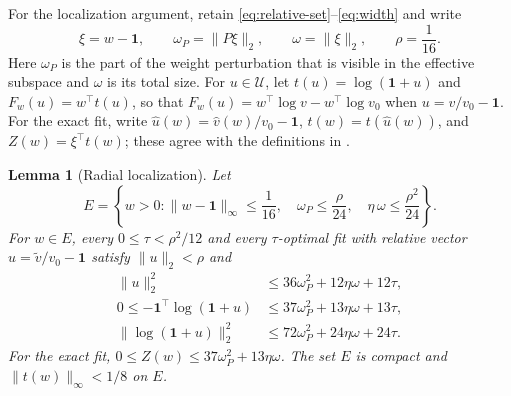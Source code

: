 \documentclass[11pt]{article}
\newtheorem{lemma}{Lemma}
\theoremstyle{definition}
\theoremstyle{remark}
\newcommand{\Ucal}{\mathcal U}
\newcommand{\one}{\bm 1}
\newcommand{\norm}[1]{\lVert #1\rVert}
\newcommand{\vhat}{\widehat v}
\newcommand{\vtil}{\widetilde v}
\begin{document}
For the localization argument, retain \eqref{eq:relative-set}--\eqref{eq:width}
and write
\[
 \xi=w-\one,\qquad \omega_P=\norm{P\xi}_2,\qquad \omega=\norm{\xi}_2,
 \qquad \rho=\frac1{16}.
\]
Here $\omega_P$ is the part of the weight perturbation that is visible in the
effective subspace and $\omega$ is its total size.  For $u\in\Ucal$, let
$t(u)=\log(\one+u)$ and $F_w(u)=w^\top t(u)$, so that
$F_w(u)=w^\top\log v-w^\top\log v_0$ when $u=v/v_0-\one$.  For the exact
fit, write $\widehat u(w)=\vhat(w)/v_0-\one$, $t(w)=t(\widehat u(w))$, and
$Z(w)=\xi^\top t(w)$; these agree with the definitions in
.

\begin{lemma}[Radial localization]
\label{lem:radial}
Let
\begin{equation}\label{eq:localization-event}
 E=\left\{w>0:
\norm{w-\one}_\infty\le\frac1{16},\quad
 \omega_P\le\frac{\rho}{24},\quad \eta\,\omega\le\frac{\rho^2}{24}\right\}.
\end{equation}
For $w\in E$, every $0\le\tau<\rho^2/12$ and every $\tau$-optimal fit with
relative vector $u=\vtil/v_0-\one$ satisfy $\norm{u}_2<\rho$ and
\begin{align}
 \norm{u}_2^2&\le36\omega_P^2+12\eta\omega+12\tau,\label{eq:radial-u}\\
 0\le-\one^\top\log(\one+u)
 &\le37\omega_P^2+13\eta\omega+13\tau,\label{eq:radial-loss}\\
 \norm{\log(\one+u)}_2^2
 &\le72\omega_P^2+24\eta\omega+24\tau.\label{eq:radial-log}
\end{align}
For the exact fit, $0\le Z(w)\le37\omega_P^2+13\eta\omega$.  The set $E$ is
compact and $\norm{t(w)}_\infty<1/8$ on $E$.
\end{lemma}
\end{document}
